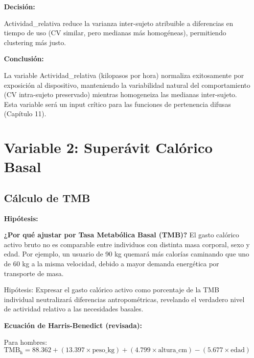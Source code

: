 \documentclass[12pt,letterpaper,twoside]{report}
\begin{document}
\begin{calculobox}
\begin{decisionbox}
\textbf{Decisión:}

Actividad\_relativa reduce la varianza inter-sujeto atribuible a diferencias en tiempo de uso (CV similar, pero medianas más homogéneas), permitiendo clustering más justo.
\end{decisionbox}

\begin{conclusionbox}
\textbf{Conclusión:}

La variable Actividad\_relativa (kilopasos por hora) normaliza exitosamente por exposición al dispositivo, manteniendo la variabilidad natural del comportamiento (CV intra-sujeto preservado) mientras homogeneiza las medianas inter-sujeto. Esta variable será un input crítico para las funciones de pertenencia difusas (Capítulo 11).
\end{conclusionbox}

\section{Variable 2: Superávit Calórico Basal}

\subsection{Cálculo de TMB}

\begin{hipotesisbox}
\textbf{Hipótesis:}

\textbf{¿Por qué ajustar por Tasa Metabólica Basal (TMB)?} El gasto calórico activo bruto no es comparable entre individuos con distinta masa corporal, sexo y edad. Por ejemplo, un usuario de 90 kg quemará más calorías caminando que uno de 60 kg a la misma velocidad, debido a mayor demanda energética por transporte de masa.

Hipótesis: Expresar el gasto calórico activo como porcentaje de la TMB individual neutralizará diferencias antropométricas, revelando el verdadero nivel de actividad relativo a las necesidades basales.
\end{hipotesisbox}

\begin{estadisticobox}
\textbf{Ecuación de Harris-Benedict (revisada):}

Para hombres:
\begin{equation}
\text{TMB}_{\text{h}} = 88.362 + (13.397 \times \text{peso\_kg}) + (4.799 \times \text{altura\_cm}) - (5.677 \times \text{edad})
\end{equation}


\end{estadisticobox}
\end{calculobox}
\end{document}
